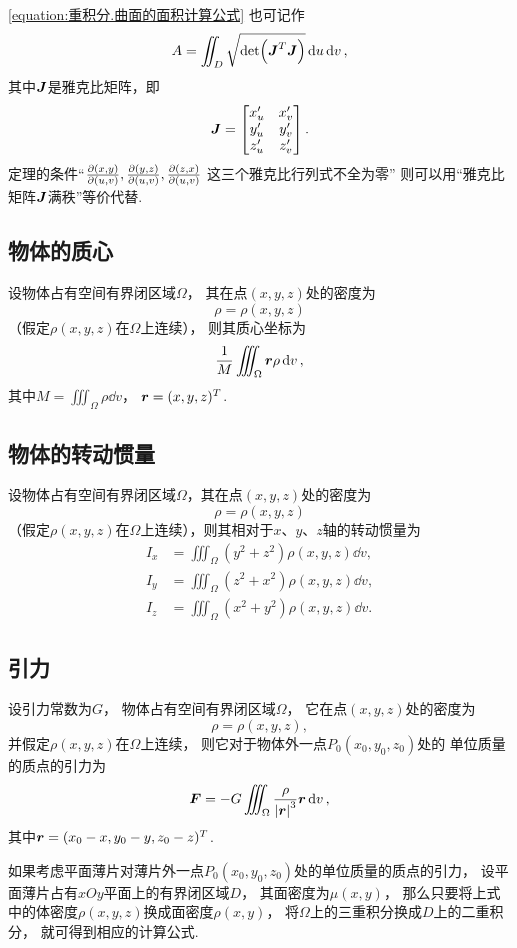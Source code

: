 \cref{equation:重积分.曲面的面积计算公式} 也可记作\[
	A = \iint_D \sqrt{\det(\boldsymbol{J}^T \boldsymbol{J})} \dd{u}\dd{v},
\]
其中\(\boldsymbol{J}\)是雅克比矩阵，即\[
	\boldsymbol{J} = \begin{bmatrix}
		x'_u & x'_v \\
		y'_u & y'_v \\
		z'_u & z'_v
	\end{bmatrix}.
\]
定理的条件“\(\pdv{ (x,y) }{ (u,v) },
\pdv{ (y,z) }{ (u,v) },
\pdv{ (z,x) }{ (u,v) }\)
这三个雅克比行列式不全为零”
则可以用“雅克比矩阵\(\boldsymbol{J}\)满秩”等价代替.

\subsection{物体的质心}
\begin{theorem}
设物体占有空间有界闭区域\(\Omega\)，
其在点\((x,y,z)\)处的密度为\[
	\rho=\rho(x,y,z)
\]
（假定\(\rho(x,y,z)\)在\(\Omega\)上连续），
则其质心坐标为\begin{equation}
	\frac{1}{M} \iiint_\Omega \boldsymbol{r} \rho \dd{v},
\end{equation}
其中\(M = \iiint_\Omega \rho \dd{v}\)，
\(\boldsymbol{r} = (x,y,z)^T\).
\end{theorem}

\subsection{物体的转动惯量}
\begin{theorem}
设物体占有空间有界闭区域\(\Omega\)，其在点\((x,y,z)\)处的密度为\[
\rho=\rho(x,y,z)
\]（假定\(\rho(x,y,z)\)在\(\Omega\)上连续），则其相对于\(x\)、\(y\)、\(z\)轴的转动惯量为\begin{align}
I_x &= \iiint_\Omega (y^2+z^2) \rho(x,y,z) \dd{v}, \\
I_y &= \iiint_\Omega (z^2+x^2) \rho(x,y,z) \dd{v}, \\
I_z &= \iiint_\Omega (x^2+y^2) \rho(x,y,z) \dd{v}.
\end{align}
\end{theorem}

\subsection{引力}
\begin{theorem}
设引力常数为\(G\)，
物体占有空间有界闭区域\(\Omega\)，
它在点\((x,y,z)\)处的密度为\[
	\rho=\rho(x,y,z),
\]
并假定\(\rho(x,y,z)\)在\(\Omega\)上连续，
则它对于物体外一点\(P_0(x_0,y_0,z_0)\)处的
单位质量的质点的引力为\begin{equation}
	\boldsymbol{F}
	= -G \iiint_\Omega \frac{\rho}{\abs{\boldsymbol{r}}^3} \boldsymbol{r} \dd{v},
\end{equation}
其中\(\boldsymbol{r}
= (x_0-x,y_0-y,z_0-z)^T\).
\end{theorem}

如果考虑平面薄片对薄片外一点\(P_0(x_0,y_0,z_0)\)处的单位质量的质点的引力，
设平面薄片占有\(xOy\)平面上的有界闭区域\(D\)，
其面密度为\(\mu(x,y)\)，
那么只要将上式中的体密度\(\rho(x,y,z)\)换成面密度\(\rho(x,y)\)，
将\(\Omega\)上的三重积分换成\(D\)上的二重积分，
就可得到相应的计算公式.
